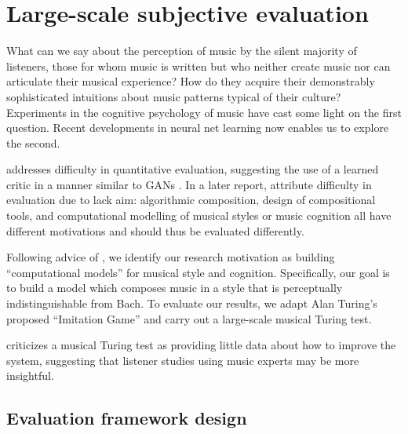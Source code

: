 \chapter{Large-scale subjective evaluation}
\begin{savequote}[75mm]
  What can we say about the perception of music by the silent majority of
  listeners, those for whom music is written but who neither create music nor
  can articulate their musical experience? How do they acquire their
  demonstrably sophisticated intuitions about music patterns
  typical of their culture? Experiments in the cognitive psychology of music
  have cast some light on the first question. Recent developments in neural net learning
  now enables us to explore the second.
\end{savequote}


\ifpdf
    \graphicspath{{Chapter6/Figs/Raster/}{Chapter6/Figs/PDF/}{Chapter6/Figs/}}
\else
    \graphicspath{{Chapter6/Figs/Vector/}{Chapter6/Figs/}}
\fi

\citep{pearce2001towards} addresses difficulty in quantitative evaluation,
suggesting the use of a learned critic in a manner similar to GANs
\citep{goodfellow2014generative}. In a later report,
\citep{pearce2002motivations} attribute difficulty in evaluation due to lack
aim: algorithmic composition, design of compositional tools, and computational
modelling of musical styles or music cognition all have different motivations
and should thus be evaluated differently.

Following advice of \citep{pearce2002motivations}, we identify our research
motivation as building ``computational models'' for musical style and cognition.
Specifically, our goal is to build a model which composes music in a style
that is perceptually indistinguishable from Bach.
To evaluate our results, we adapt Alan Turing's proposed ``Imitation Game''
\citep{turing1950computing} and carry out a large-scale musical Turing test.

\citep{ariza2009interrogator} criticizes a musical Turing test as providing little data about
how to improve the system, suggesting that listener studies using music experts
may be more insightful.

\section{Evaluation framework design}

